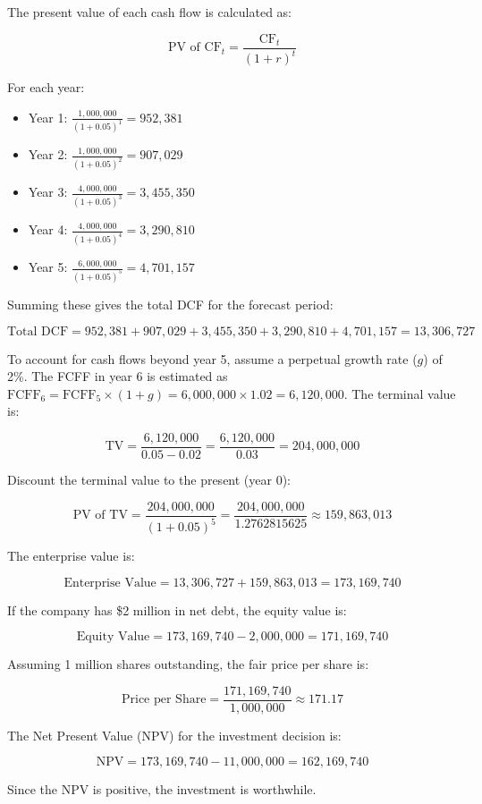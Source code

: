 \documentclass[12pt]{article}
\begin{document}
The present value of each cash flow is calculated as:

\[
\text{PV of CF}_t = \frac{\text{CF}_t}{(1 + r)^t}
\]

For each year:
\begin{itemize}
    \item Year 1: \(\frac{1,000,000}{(1 + 0.05)^1} = 952,381\)
    \item Year 2: \(\frac{1,000,000}{(1 + 0.05)^2} = 907,029\)
    \item Year 3: \(\frac{4,000,000}{(1 + 0.05)^3} = 3,455,350\)
    \item Year 4: \(\frac{4,000,000}{(1 + 0.05)^4} = 3,290,810\)
    \item Year 5: \(\frac{6,000,000}{(1 + 0.05)^5} = 4,701,157\)
\end{itemize}

Summing these gives the total DCF for the forecast period:

\[
\text{Total DCF} = 952,381 + 907,029 + 3,455,350 + 3,290,810 + 4,701,157 = 13,306,727
\]

To account for cash flows beyond year 5, assume a perpetual growth rate (\(g\)) of 2\%. The FCFF in year 6 is estimated as \(\text{FCFF}_6 = \text{FCFF}_5 \times (1 + g) = 6,000,000 \times 1.02 = 6,120,000\). The terminal value is:

\[
\text{TV} = \frac{6,120,000}{0.05 - 0.02} = \frac{6,120,000}{0.03} = 204,000,000
\]

Discount the terminal value to the present (year 0):

\[
\text{PV of TV} = \frac{204,000,000}{(1 + 0.05)^5} = \frac{204,000,000}{1.2762815625} \approx 159,863,013
\]

The enterprise value is:

\[
\text{Enterprise Value} = 13,306,727 + 159,863,013 = 173,169,740
\]

If the company has \$2 million in net debt, the equity value is:

\[
\text{Equity Value} = 173,169,740 - 2,000,000 = 171,169,740
\]

Assuming 1 million shares outstanding, the fair price per share is:

\[
\text{Price per Share} = \frac{171,169,740}{1,000,000} \approx 171.17
\]

The Net Present Value (NPV) for the investment decision is:

\[
\text{NPV} = 173,169,740 - 11,000,000 = 162,169,740
\]

Since the NPV is positive, the investment is worthwhile.
\end{document}
